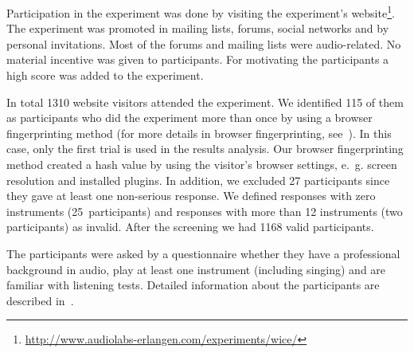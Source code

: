 Participation in the experiment was done by visiting the experiment's website\footnote{{\scriptsize\url{http://www.audiolabs-erlangen.com/experiments/wice/}}}. The experiment was promoted in mailing lists, forums, social networks and by personal invitations. Most of the forums and mailing lists were audio-related. No material incentive was given to participants. For motivating the participants a high score was added to the experiment.
\par
In total 1310 website visitors attended the experiment.
We identified 115 of them as participants who did the experiment more than once by using a browser fingerprinting method (for more details in browser fingerprinting, see~\cite{Eckersley2010}).
In this case, only the first trial is used in the results analysis.
Our browser fingerprinting method created a hash value by using the visitor's browser settings, e.~g. screen resolution and installed plugins. In addition, we excluded 27 participants since they gave at least one non-serious response. We defined responses with zero instruments (25~participants) and responses with more than 12 instruments (two participants) as invalid. After the screening we had 1168 valid participants.
\par
The participants were asked by a questionnaire whether they have a professional background in audio, play at least one instrument (including singing) and are familiar with listening tests. Detailed information about the participants are described in~\cite{schoeffler13}.
